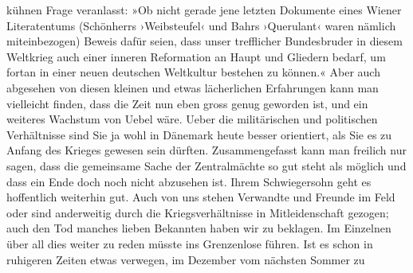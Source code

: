 \begin{ledgroupsized}[t]{13cm}
               kühnen Frage veranlasst: »Ob nicht
                  gerade jene letzten Dokumente eines Wiener
                  Literatentums (Schön{\pb}herrs ›Weibsteufel‹ und Bahrs ›Querulant‹ waren nämlich miteinbezogen) Beweis
                  dafür seien, dass unser trefflicher Bundesbruder in diesem Weltkrieg auch einer
                  inneren Reformation an Haupt und Gliedern bedarf, um fortan in einer neuen
                  deutschen Weltkultur bestehen zu können.«\pend
           \pstart
           Aber auch abgesehen von diesen kleinen und etwas lächerlichen Erfahrungen kann man
               vielleicht finden, dass die Zeit nun eben gross genug geworden ist, und ein weiteres
               Wachstum von Uebel wäre. Ueber die militärischen und politischen Verhältnisse sind
               Sie ja wohl in Dänemark heute besser orientiert,
               als Sie es zu Anfang des Krieges gewesen \introOben{}sein\introOben{} dürften.
               Zusammengefasst kann man freilich nur sagen, dass die gemeinsame Sache der
               Zentralmächte so gut steht als möglich und dass ein Ende doch noch nicht abzusehen
               ist. Ihrem Schwiegersohn geht es
               hoffentlich weiterhin gut. Auch von uns stehen Verwandte und Freunde im Feld oder
               sind anderweitig durch die Kriegsverhältnisse in Mitleidenschaft gezogen; auch den
               Tod manches lieben {\pb}Bekannten haben wir zu
               beklagen. Im Einzelnen über all dies weiter zu reden müsste ins Grenzenlose führen.
               Ist es schon in ruhigeren Zeiten etwas verwegen, im Dezember vom nächsten Sommer zu

\end{ledgroupsized}
